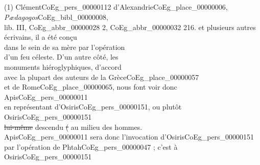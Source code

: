 \documentclass{book}
\begin{document}
{\begin{paracol}{2}
\noindent \\
\\
\\
\\
\\
\\
\\
\\
\\
\\
\\
\\
\\
\\
\\
\\
\\
\\
\\
\\
\\
\\
\\
\\
\\
\\
\\
\\
\\
\\
\\
\noindent (1) Clément\gls{CoEg_pers_00000112} d’Alexandrie\gls{CoEg_place_00000006}, \textit{Pædagogos}\gls{CoEg_bibl_00000008},\\
lib. III, \gls{CoEg_abbr_00000028} 2, \gls{CoEg_abbr_00000032} 216.
\switchcolumn
\noindent et plusieurs autres écrivains, il a été conçu\\
dans le sein de sa mère par l’opération\\
d’un feu céleste. D’un autre côté, les\\
monuments hiéroglyphiques, d’accord\\
avec la plupart des auteurs de la Grèce\gls{CoEg_place_00000057}\\
et de Rome\gls{CoEg_place_00000065}, nous font voir donc Apis\gls{CoEg_pers_00000011}\\
en représentant d’Osiris\gls{CoEg_pers_00000151}, ou plutôt Osiris\gls{CoEg_pers_00000151}\\
\sout{lui-même} descendu \sout{(} au milieu des hommes.\\
Apis\gls{CoEg_pers_00000011} sera donc l’invocation d’Osiris\gls{CoEg_pers_00000151}\\
par l’opération de Phtah\gls{CoEg_pers_00000047} ; c’est à Osiris\gls{CoEg_pers_00000151}\\

\end{paracol}}
\end{document}
